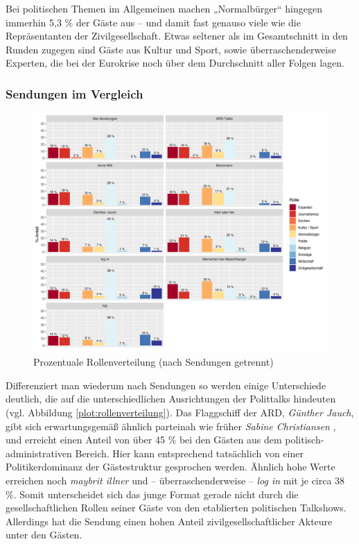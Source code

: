 Bei politischen Themen im Allgemeinen machen „Normalbürger“ hingegen immerhin 5,3 \% der Gäste aus – und damit fast genauso viele wie die Repräsentanten der Zivilgesellschaft. Etwas seltener als im Gesamtschnitt in den Runden zugegen sind Gäste aus Kultur und Sport, sowie überraschenderweise Experten, die bei der Eurokrise noch über dem Durchschnitt aller Folgen lagen.

\subsubsection{Sendungen im Vergleich}

\begin{figure}[ht]
	\centering
	\includegraphics[width=1\textwidth]{daten/grafiken/plot_rollenverteilung.png}
	\caption{Prozentuale Rollenverteilung (nach Sendungen getrennt)}
	\label{plot:rollenverteilung}
\end{figure}

Differenziert man wiederum nach Sendungen so werden einige Unterschiede deutlich, die auf die unterschiedlichen Ausrichtungen der Polittalks hindeuten (vgl. Abbildung \vref{plot:rollenverteilung}). Das Flaggschiff der ARD, \textit{Günther Jauch}, gibt sich erwartungsgemäß ähnlich parteinah wie früher \textit{Sabine Christiansen} \parencite[4f.]{muellerSchaubuehneFuerEinflussreichen2006}, und erreicht einen Anteil von über 45 \% bei den Gästen aus dem politisch-administrativen Bereich. Hier kann entsprechend tatsächlich von einer Politikerdominanz der Gästestruktur gesprochen werden. Ähnlich hohe Werte erreichen noch \textit{maybrit illner} und – überraschenderweise – \textit{log in} mit je circa 38 \%. Somit unterscheidet sich das junge Format gerade nicht durch die gesellschaftlichen Rollen seiner Gäste von den etablierten politischen Talkshows. Allerdings hat die Sendung einen hohen Anteil zivilgesellschaftlicher Akteure unter den Gästen.

